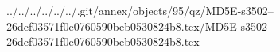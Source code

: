 ../../../../../../.git/annex/objects/95/qz/MD5E-s3502--26dcf03571f0e0760590beb0530824b8.tex/MD5E-s3502--26dcf03571f0e0760590beb0530824b8.tex